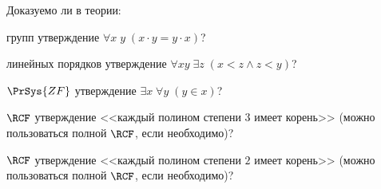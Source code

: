 Доказуемо ли в теории:
\begin{enumcyr}
    \item групп утверждение $\forall x\; y\; (x \cdot y = y \cdot x)$?
    \item линейных порядков утверждение $\forall xy\; \exists z\; (x < z \wedge z < y)$?
    \item $\PrSys{ZF}$ утверждение $\exists x \; \forall y\; (y \in x)$?
    \item $\RCF$ утверждение <<каждый полином степени $3$ имеет корень>> (можно пользоваться
        полной $\RCF$, если необходимо)?
    \item $\RCF$ утверждение <<каждый полином степени $2$ имеет корень>> (можно пользоваться
        полной $\RCF$, если необходимо)?
\end{enumcyr}